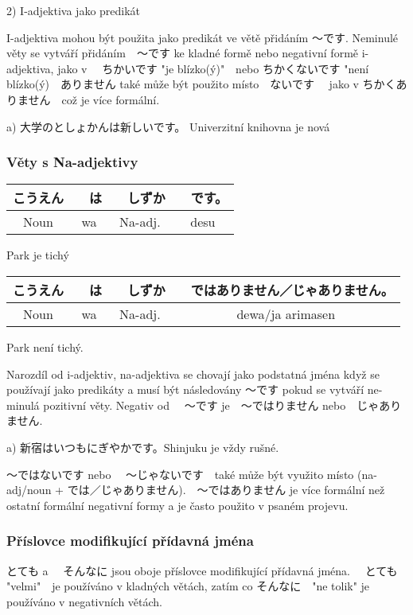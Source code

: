 2) I-adjektiva jako predikát

I-adjektiva mohou být použita jako predikát ve větě přidáním 〜です. Neminulé věty se vytváří přidáním　〜です ke kladné formě nebo negativní formě i-adjektiva, jako v 　ちかいです "je blízko(ý)"　nebo ちかくないです "není blízko(ý)　ありません také může být použito místo　ないです　 jako  v ちかくありません　což je více formální.

a) 大学のとしょかんは新しいです。 Univerzitní knihovna je nová

\subsubsection{Věty s Na-adjektivy}
\begin{center}
\begin{tabular}{|c|c|c|c|}
\hline
こうえん&　は&　しずか&　です。\\
\hline
Noun&wa&Na-adj.&desu\\
\hline
\end{tabular}
\end{center}
Park je tichý


\begin{center}
\begin{tabular}{|c|c|c|c|}
\hline
こうえん&　は&　しずか&　ではありません／じゃありません。\\
\hline
Noun&wa&Na-adj.&dewa/ja arimasen\\
\hline
\end{tabular}
\end{center}
Park není tichý.

Narozdíl od i-adjektiv, na-adjektiva se chovají jako podstatná jména když se používají jako predikáty a musí být následovány 〜です pokud se vytváří ne-minulá pozitivní věty. Negativ od 　〜です je　〜ではりません nebo　じゃありません.

a) 新宿はいつもにぎやかです。Shinjuku je vždy rušné.



〜ではないです nebo 　〜じゃないです　také může být využito místo  (na-adj/noun +  では／じゃありません).　〜ではありません je více formální než ostatní formální negativní formy a je často použito v psaném projevu.　

\subsubsection{Příslovce modifikující přídavná jména}
とても a 　そんなに jsou oboje příslovce modifikující přídavná jména. 　とても "velmi"　je používáno v kladných větách, zatím co そんなに　"ne tolik" je používáno v negativních větách.

